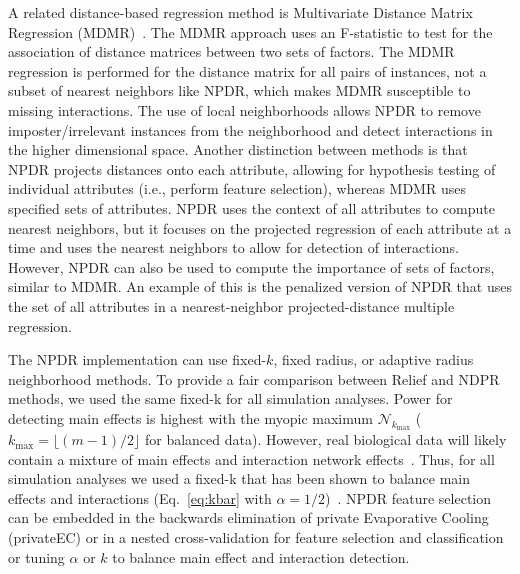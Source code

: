 \documentclass{bioinfo}
\begin{document}
A related distance-based regression method is Multivariate Distance Matrix Regression (MDMR)~\citep{schork12}.
The MDMR approach uses an F-statistic to test for the association of distance matrices between two sets of factors.
The MDMR regression is performed for the distance matrix for all pairs of instances, not a subset of nearest neighbors like NPDR, which makes MDMR susceptible to missing interactions.
The use of local neighborhoods allows NPDR to remove imposter/irrelevant instances from the neighborhood and detect interactions in the higher dimensional space.
Another distinction between methods is that NPDR projects distances onto each attribute, allowing for hypothesis testing of individual attributes (i.e., perform feature selection), whereas MDMR uses specified sets of attributes.
NPDR uses the context of all attributes to compute nearest neighbors, but it focuses on the projected regression of each attribute at a time and uses the nearest neighbors to allow for detection of interactions. However, NPDR can also be used to compute the importance of sets of factors, similar to MDMR.
An example of this is the penalized version of NPDR that uses the set of all attributes in a nearest-neighbor projected-distance multiple regression.

The NPDR implementation can use fixed-$k$, fixed radius, or adaptive radius neighborhood methods. To provide a fair comparison between Relief and NDPR methods, we used the same fixed-k for all simulation analyses.
Power for detecting main effects is highest with the myopic maximum $\mathcal{N}_{k_\text{max}}$ ($k_{\text{max}}=\lfloor (m-1)/2\rfloor$ for balanced data).
However, real biological data will likely contain a mixture of main effects and interaction network effects~\citep{mckinney_pajewski}. Thus, for all simulation analyses we used a fixed-k that has been shown to balance main effects and interactions (Eq.~\ref{eq:kbar} with $\alpha=1/2$)~\citep{stir}.
NPDR feature selection can be embedded in the backwards elimination of private Evaporative Cooling (privateEC) or in a nested cross-validation for feature selection and classification~\citep{le17} or tuning $\alpha$ or $k$ to balance main effect and interaction detection.
\end{document}

